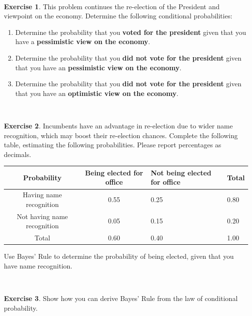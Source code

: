 \documentclass[
]{book}
\providecommand{\tightlist}{%
  \setlength{\itemsep}{0pt}\setlength{\parskip}{0pt}}
\theoremstyle{definition}
\theoremstyle{definition}
\theoremstyle{definition}
\newtheorem{exercise}{Exercise}[chapter]
\theoremstyle{remark}
\begin{document}
~

\begin{exercise}
\protect\hypertarget{exr:unnamed-chunk-183}{}{\label{exr:unnamed-chunk-183} }This problem continues the re-election of the President and viewpoint on the economy. Determine the following conditional probabilities:

\begin{enumerate}
\def\labelenumi{\alph{enumi}.}
\tightlist
\item
  Determine the probability that you \textbf{voted for the president} given that you have a \textbf{pessimistic view on the economy}.
\item
  Determine the probability that you \textbf{did not vote for the president} given that you have an \textbf{pessimistic view on the economy}.
\item
  Determine the probability that you \textbf{did not vote for the president} given that you have an \textbf{optimistic view on the economy}.
\end{enumerate}
\end{exercise}

~

\begin{exercise}
\protect\hypertarget{exr:unnamed-chunk-184}{}{\label{exr:unnamed-chunk-184} }Incumbents have an advantage in re-election due to wider name recognition, which may boost their re-election chances. Complete the following table, estimating the following probabilities. Please report percentages as decimals.

\begin{longtable}[]{@{}ccll@{}}
\toprule
Probability & Being elected for office & Not being elected for office & Total \\
\midrule
\endhead
Having name recognition & 0.55 & 0.25 & 0.80 \\
Not having name recognition & 0.05 & 0.15 & 0.20 \\
Total & 0.60 & 0.40 & 1.00 \\
\bottomrule
\end{longtable}

Use Bayes' Rule to determine the probability of being elected, given that you have name recognition.
\end{exercise}

~

\begin{exercise}
\protect\hypertarget{exr:unnamed-chunk-185}{}{\label{exr:unnamed-chunk-185} }Show how you can derive Bayes' Rule from the law of conditional probability.
\end{exercise}
\end{document}

